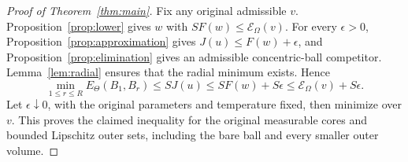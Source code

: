 \begin{proof}[Proof of Theorem~\ref{thm:main}]
Fix any original admissible \(v\). Proposition~\ref{prop:lower}
gives \(w\) with \(S F(w)\le\mathcal E_\Omega(v)\).
For every \(\epsilon>0\), Proposition~\ref{prop:approximation}
gives \(J(u)\le F(w)+\epsilon\), and
Proposition~\ref{prop:elimination} gives an admissible concentric-ball competitor.
Lemma~\ref{lem:radial} ensures that the radial minimum exists.
Hence
\[
 \min_{1\le r\le R}E_\Theta(B_1,B_r)
        \le S J(u)\le S F(w)+S\epsilon
        \le\mathcal E_\Omega(v)+S\epsilon.
\]
Let \(\epsilon\downarrow0\), with the original parameters and
temperature fixed, then minimize over \(v\).
This proves the claimed inequality for the original measurable
cores and bounded Lipschitz outer sets, including the bare ball
and every smaller outer volume.
\end{proof}
